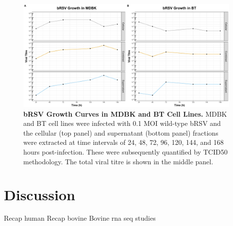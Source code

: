 \begin{figure}
    \centering
    \includegraphics[width=1\linewidth]{07. Chapter 2/Figs/01. Technologies/01. growth_curves.pdf}
    \caption[bRSV Growth Curves in MDBK and BT Cell Lines.]{\textbf{bRSV Growth Curves in MDBK and BT Cell Lines.} MDBK and BT cell lines were infected with 0.1 MOI wild-type bRSV and the cellular (top panel) and supernatant (bottom panel) fractions were extracted at time intervals of 24, 48, 72, 96, 120, 144, and 168 hours post-infection. These were subsequently quantified by TCID50 methodology. The total viral titre is shown in the middle panel.}
    \label{fig:bRSV growth curves in MDBK and BT cell lines}
\end{figure}



\section{Discussion} \label{sec:Discussion Chapter2}
Recap human \newline
Recap bovine \newline
Bovine rna seq studies



